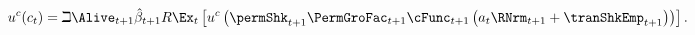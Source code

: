   \begin{equation}\begin{gathered}\begin{aligned}
        \uFunc^{c}(c_{\prd}) & = \beth\Alive_{\prd+1}\hat{\DiscFac}_{\prd+1}\Rfree \Ex_{\prd}\left[\uFunc^{c}\left(\permShk_{\prd+1}\PermGroFac_{\prd+1}\cFunc_{\prd+1}\left(a_{\prd}\RNrm_{\prd+1}+\tranShkEmp_{\prd+1}\right)\right)\right]\label{eq:FOCLifeCycle}
        .
      \end{aligned}\end{gathered}\end{equation}
